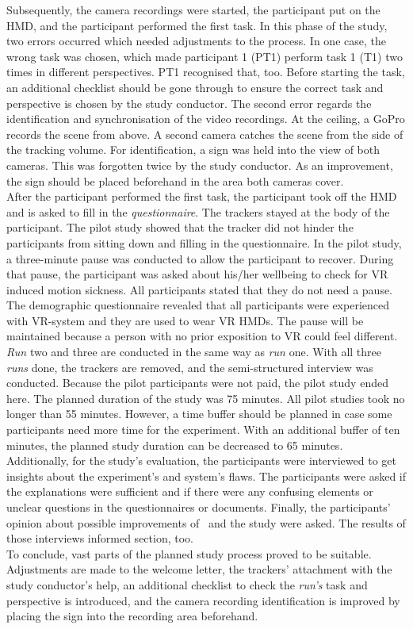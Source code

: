 Subsequently, the camera recordings were started, the participant put on the HMD, and the participant performed the first task. In this phase of the study, two errors occurred which needed adjustments to the process. In one case, the wrong task was chosen, which made participant 1 (PT1) perform task 1 (T1) two times in different perspectives. PT1 recognised that, too. Before starting the task, an additional checklist should be gone through to ensure the correct task and perspective is chosen by the study conductor. The second error regards the identification and synchronisation of the video recordings. At the ceiling, a GoPro records the scene from above. A second camera catches the scene from the side of the tracking volume. For identification, a sign was held into the view of both cameras. This was forgotten twice by the study conductor. As an improvement, the sign should be placed beforehand in the area both cameras cover.\\
After the participant performed the first task, the participant took off the HMD and is asked to fill in the \textit{questionnaire}. The trackers stayed at the body of the participant. The pilot study showed that the tracker did not hinder the participants from sitting down and filling in the questionnaire. In the pilot study, a three-minute pause was conducted to allow the participant to recover. During that pause, the participant was asked about his/her wellbeing to check for VR induced motion sickness. All participants stated that they do not need a pause. The demographic questionnaire revealed that all participants were experienced with VR-system and they are used to wear VR HMDs. The pause will be maintained because a person with no prior exposition to VR could feel different.\\
\textit{Run} two and three are conducted in the same way as \textit{run} one. With all three \textit{runs} done, the trackers are removed, and the semi-structured interview was conducted. Because the pilot participants were not paid, the pilot study ended here. The planned duration of the study was 75 minutes. All pilot studies took no longer than 55 minutes. However, a time buffer should be planned in case some participants need more time for the experiment. With an additional buffer of ten minutes, the planned study duration can be decreased to 65 minutes.\\
Additionally, for the study's evaluation, the participants were interviewed to get insights about the experiment's and system's flaws. The participants were asked if the explanations were sufficient and if there were any confusing elements or unclear questions in the questionnaires or documents. Finally, the participants' opinion about possible improvements of \exgo\ and the study were asked. The results of those interviews informed section, too.\\
To conclude, vast parts of the planned study process proved to be suitable. Adjustments are made to the welcome letter, the trackers' attachment with the study conductor's help, an additional checklist to check the \textit{run's} task and perspective is introduced, and the camera recording identification is improved by placing the sign into the recording area beforehand.

